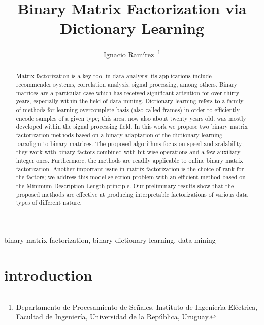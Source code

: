 \documentclass[twocolumn]{IEEEtran}
\title{Binary Matrix Factorization via Dictionary Learning}
\author{Ignacio Ram\'{i}rez~\IEEEmembership{Member,~IEEE}\thanks{Departamento de Procesamiento de Se\~{n}ales, Instituto de Ingenier\'{\i}a El\'{e}ctrica, Facultad de Ingenier\'{i}a, Universidad de la Rep\'{u}blica, Uruguay.} }
\theoremstyle{definition}
\begin{document}
%
\maketitle
%
\begin{abstract}
Matrix factorization is a key tool in data analysis; its applications include recommender systems, correlation analysis, signal processing, among others. Binary matrices are a particular case which has received significant attention for over thirty years, especially within the field of data mining. Dictionary learning refers to a family of methods for learning overcomplete basis (also called frames) in order to efficiently encode samples of a given type; this area, now also about twenty years old, was mostly developed within the signal processing field.
In this work we propose two binary matrix factorization methods based on a binary adaptation of the dictionary learning paradigm to binary matrices.
The proposed algorithms focus on speed and scalability; they work with binary factors combined with bit-wise operations and a few auxiliary integer ones. Furthermore, the methods are readily applicable to online binary matrix factorization.
Another important issue in matrix factorization is the choice of rank for the factors; we address this model selection problem with an efficient method based on the Minimum Description Length principle.
Our preliminary results show that the proposed methods are effective at producing interpretable factorizations of various data types of different nature.
\end{abstract}%
\begin{IEEEkeywords}
binary matrix factorization, binary dictionary learning, data mining
\end{IEEEkeywords}
%
\section{introduction}
\end{document}
